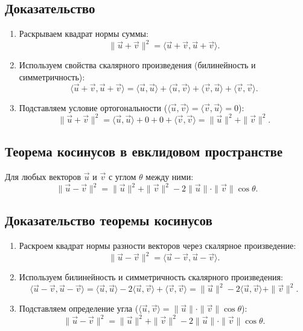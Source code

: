 \documentclass[12pt]{article}
\begin{document}
\subsection*{Доказательство}
\begin{enumerate}
    \item Раскрываем квадрат нормы суммы:
    $$
    \|\vec{u} + \vec{v}\|^2 = \langle \vec{u} + \vec{v}, \vec{u} + \vec{v} \rangle.
    $$
    \item Используем свойства скалярного произведения (билинейность и симметричность):
    $$
    \langle \vec{u} + \vec{v}, \vec{u} + \vec{v} \rangle = \langle \vec{u}, \vec{u} \rangle + \langle \vec{u}, \vec{v} \rangle + \langle \vec{v}, \vec{u} \rangle + \langle \vec{v}, \vec{v} \rangle.
    $$
    \item Подставляем условие ортогональности ($\langle \vec{u}, \vec{v} \rangle = \langle \vec{v}, \vec{u} \rangle = 0$):
    $$
    \|\vec{u} + \vec{v}\|^2 = \langle \vec{u}, \vec{u} \rangle + 0 + 0 + \langle \vec{v}, \vec{v} \rangle = \|\vec{u}\|^2 + \|\vec{v}\|^2.
    $$
\end{enumerate}

\subsection*{Теорема косинусов в евклидовом пространстве}
Для любых векторов $\vec{u}$ и $\vec{v}$ с углом $\theta$ между ними:
$$
\|\vec{u} - \vec{v}\|^2 = \|\vec{u}\|^2 + \|\vec{v}\|^2 - 2\|\vec{u}\| \cdot \|\vec{v}\| \cos \theta.
$$

\subsection*{Доказательство теоремы косинусов}
\begin{enumerate}
    \item Раскроем квадрат нормы разности векторов через скалярное произведение:
    $$
    \|\vec{u} - \vec{v}\|^2 = \langle \vec{u} - \vec{v}, \vec{u} - \vec{v} \rangle.
    $$
    \item Используем билинейность и симметричность скалярного произведения:
    $$
    \langle \vec{u} - \vec{v}, \vec{u} - \vec{v} \rangle = \langle \vec{u}, \vec{u} \rangle - 2\langle \vec{u}, \vec{v} \rangle + \langle \vec{v}, \vec{v} \rangle = \|\vec{u}\|^2 - 2\langle \vec{u}, \vec{v} \rangle + \|\vec{v}\|^2.
    $$
    \item Подставляем определение угла ($\langle \vec{u}, \vec{v} \rangle = \|\vec{u}\| \cdot \|\vec{v}\| \cos \theta$):
    $$
    \|\vec{u} - \vec{v}\|^2 = \|\vec{u}\|^2 + \|\vec{v}\|^2 - 2\|\vec{u}\| \cdot \|\vec{v}\| \cos \theta.
    $$
\end{enumerate}
\end{document}
